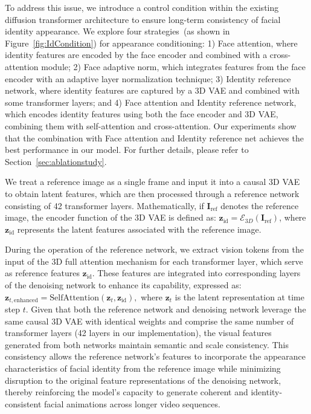 To address this issue, we introduce a control condition within the existing diffusion transformer architecture to ensure long-term consistency of facial identity appearance. 
{We explore four strategies~(as shown in Figure~\ref{fig:IdCondition}) for appearance conditioning: 1) Face attention, where identity features are encoded by the face encoder and combined with a cross-attention module; 2) Face adaptive norm, which integrates features from the face encoder with an adaptive layer normalization technique; 3) Identity reference network, where identity features are captured by a 3D VAE and combined with some transformer layers; and 4) Face attention and Identity reference network, which encodes identity features using both the face encoder and 3D VAE, combining them with self-attention and cross-attention. Our experiments show that the combination with Face attention and Identity reference net achieves the best performance in our model. For further details, please refer to Section~\ref{sec:ablationstudy}. }

We treat a reference image as a single frame and input it into a causal 3D VAE to obtain latent features, which are then processed through a reference network consisting of 42 transformer layers. Mathematically, if \(\mathbf{I}_{\text{ref}}\) denotes the reference image, the encoder function of the 3D VAE is defined as: $\mathbf{z}_\text{id} = \mathcal{E}_{3D}(\mathbf{I}_{\text{ref}})$,
where \(\mathbf{z}_{\text{id}}\) represents the latent features associated with the reference image.  

During the operation of the reference network, we extract vision tokens from the input of the 3D full attention mechanism for each transformer layer, which serve as reference features \(\mathbf{z}_{\text{id}}\). These features are integrated into corresponding layers of the denoising network to enhance its capability, expressed as: $\mathbf{z}_{t, \text{enhanced}} = \text{SelfAttention}(\mathbf{z}_t, \mathbf{z}_{\text{id}}),$
where \(\mathbf{z}_t\) is the latent representation at time step \(t\). 
Given that both the reference network and denoising network leverage the same causal 3D VAE with identical weights and comprise the same number of transformer layers (42 layers in our implementation), the visual features generated from both networks maintain semantic and scale consistency. 
This consistency allows the reference network's features to incorporate the appearance characteristics of facial identity from the reference image while minimizing disruption to the original feature representations of the denoising network, thereby reinforcing the model's capacity to generate coherent and identity-consistent facial animations across longer video sequences.

